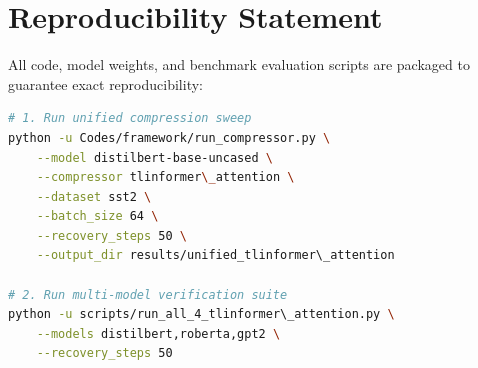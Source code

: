 \section{Reproducibility Statement}
All code, model weights, and benchmark evaluation scripts are packaged to guarantee exact reproducibility:
\begin{lstlisting}[language=bash]
# 1. Run unified compression sweep
python -u Codes/framework/run_compressor.py \
    --model distilbert-base-uncased \
    --compressor tlinformer\_attention \
    --dataset sst2 \
    --batch_size 64 \
    --recovery_steps 50 \
    --output_dir results/unified_tlinformer\_attention

# 2. Run multi-model verification suite
python -u scripts/run_all_4_tlinformer\_attention.py \
    --models distilbert,roberta,gpt2 \
    --recovery_steps 50
\end{lstlisting}
